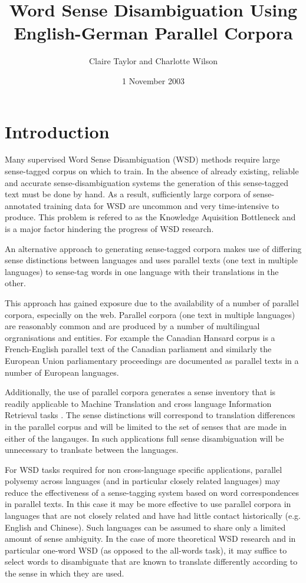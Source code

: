 \documentclass[a4wide,10pt]{article}
\title{Word Sense Disambiguation Using English-German Parallel Corpora}
\author{Claire Taylor and Charlotte Wilson}
\date{1 November 2003}
\begin{document}
\maketitle

\section{Introduction}
Many supervised Word Sense Disambiguation (WSD) methods require
large sense-tagged corpus on which to train.
In the absence of already existing, reliable and accurate 
sense-disambiguation systems the generation of this sense-tagged text 
must be done by hand. As a result, sufficiently large corpora of 
sense-annotated training data for WSD are uncommon and very time-intensive 
to produce. This problem is refered to as the Knowledge Aquisition 
Bottleneck and is a major factor hindering the progress of WSD research.

An alternative approach to generating sense-tagged corpora makes use of 
differing sense distinctions between languages and uses parallel texts 
(one text in multiple languages) to sense-tag words in one language with 
their translations in the other. 

This approach has gained exposure due to the availability of a number 
of parallel corpora, especially on the web. Parallel corpora (one text 
in multiple languages) are reasonably common and are produced by a 
number of multilingual orgranisations and entities. For example  
the Canadian Hansard corpus is a French-English parallel text of 
the Canadian parliament and similarly the European Union parliamentary 
proceedings are documented as parallel texts in a number of European 
languages.  

Additionally, the use of parallel corpora generates a sense inventory that 
is readily applicable to Machine Translation and cross language Information 
Retrieval tasks \cite{yarowsky}.
The sense distinctions will correspond to translation 
differences in the parallel corpus and will be limited to the set of senses 
that are made in either of the langauges. In such applications full sense 
disambiguation will be unnecessary to tranlsate between the languages.    

For WSD tasks required for non cross-language specific applications, 
parallel polysemy across languages (and in particular closely related 
languages) may reduce the effectiveness of a sense-tagging system based on
word correspondences in parallel texts. In this case it may be more 
effective to use parallel corpora in languages that are not closely related 
and have had little contact historically (e.g. English and Chinese). Such 
languages can be assumed to share only a limited amount 
of sense ambiguity. In the case of more theoretical WSD research and in 
particular one-word WSD (as opposed to the all-words task), it may 
suffice to select words to disambiguate that are known to 
translate differently according to the sense in which they are used.
\end{document}
